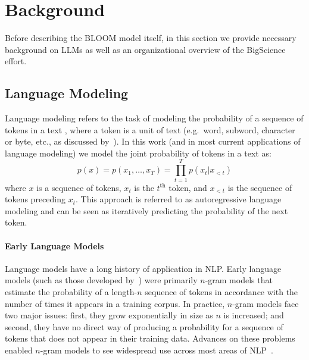 \documentclass[twoside,11pt]{article}
\begin{document}
\section{Background}
\label{sec:background}

Before describing the BLOOM model itself, in this section we provide necessary background on LLMs as well as an organizational overview of the BigScience effort.

\subsection{Language Modeling}
Language modeling refers to the task of modeling the probability of a sequence of tokens in a text \citep{shannon1948mathematical}, where a token is a unit of text (e.g.\ word, subword, character or byte, etc., as discussed by~\citealp{mielke2021between}).
In this work (and in most current applications of language modeling) we model the joint probability of tokens in a text as:
\begin{equation}
    p(x) = p(x_1, \ldots, x_T) = \prod_{t = 1}^T p(x_t | x_{< t})
\end{equation}
where $x$ is a sequence of tokens, $x_t$ is the $t^{\mathrm{th}}$ token, and $x_{< t}$ is the sequence of tokens preceding $x_t$.
This approach is referred to as autoregressive language modeling and can be seen as iteratively predicting the probability of the next token.

\paragraph{Early Language Models}
Language models have a long history of application in NLP.
Early language models (such as those developed by~\citealp{shannon1948mathematical}) were primarily $n$-gram models that estimate the probability of a length-$n$ sequence of tokens in accordance with the number of times it appears in a training corpus.
In practice, $n$-gram models face two major issues: first, they grow exponentially in size as $n$ is increased; and second, they have no direct way of producing a probability for a sequence of tokens that does not appear in their training data.
Advances on these problems enabled $n$-gram models to see widespread use across most areas of NLP~\citep{goodman2001bit}.
\end{document}
